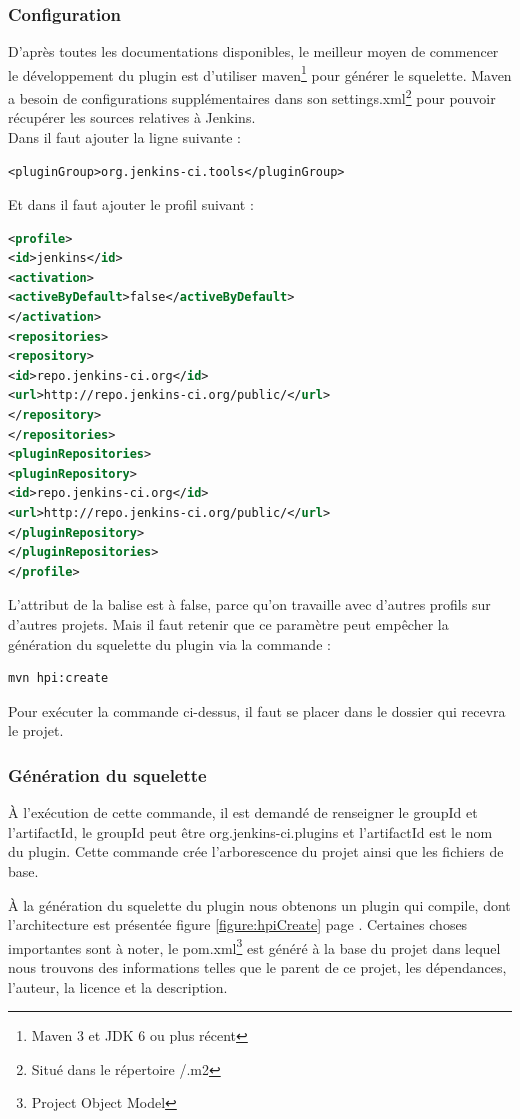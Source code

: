 \subsubsection{Configuration}
D'après toutes les documentations disponibles, le meilleur moyen de commencer le développement du plugin est d'utiliser maven\footnote{Maven 3 et JDK 6 ou plus récent} pour générer le squelette. Maven a besoin de configurations supplémentaires dans son settings.xml\footnote{Situé dans le répertoire \texttildelow/.m2} pour pouvoir récupérer les sources relatives à Jenkins.\\
Dans  il faut ajouter la ligne suivante :
\begin{lstlisting}
<pluginGroup>org.jenkins-ci.tools</pluginGroup>
\end{lstlisting}
Et dans  il faut ajouter le profil suivant :
\begin{lstlisting}[language=xml]
<profile>
<id>jenkins</id>
<activation>
<activeByDefault>false</activeByDefault>
</activation>
<repositories>
<repository>
<id>repo.jenkins-ci.org</id>
<url>http://repo.jenkins-ci.org/public/</url>
</repository>
</repositories>
<pluginRepositories>
<pluginRepository>
<id>repo.jenkins-ci.org</id>
<url>http://repo.jenkins-ci.org/public/</url>
</pluginRepository>
</pluginRepositories>
</profile>
\end{lstlisting}

L'attribut de la balise  est à false, parce qu'on travaille avec d'autres profils sur d'autres projets. Mais il faut retenir que ce paramètre peut empêcher la génération du squelette du plugin via la commande :
\begin{lstlisting}[language=xml]
mvn hpi:create
\end{lstlisting}

Pour exécuter la commande ci-dessus, il faut se placer dans le dossier qui recevra le projet. 


\subsubsection{Génération du squelette}
\`{A} l'exécution de cette commande, il est demandé de renseigner le groupId et l'artifactId, le groupId peut être  org.jenkins-ci.plugins et l'artifactId est le nom du plugin. Cette commande crée l'arborescence du projet ainsi que les fichiers de base. 


\`{A} la génération du squelette du plugin nous obtenons un plugin qui compile, dont l'architecture est présentée figure \ref{figure:hpiCreate} page \pageref{figure:hpiCreate}. Certaines choses importantes sont à noter, le pom.xml\footnote{Project Object Model} est généré à la base du projet dans lequel nous trouvons des informations telles que le parent de ce projet, les dépendances, l'auteur, la licence et la description.

